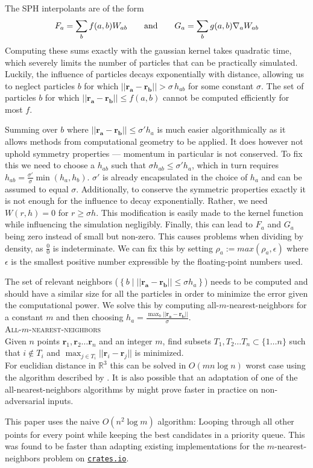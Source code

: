 \documentclass[../main.tex]{subfiles}
\begin{document}
The SPH interpolants are of the form
\[ F_a = \sum_b f(a, b) W_{ab} \qquad\textnormal{and}\qquad G_a = \sum_b g(a, b) \nabla_a W_{ab} \]
Computing these sums exactly with the gaussian kernel takes quadratic time, which severely limits
the number of particles that can be practically simulated. Luckily, the influence of particles
decays exponentially with distance, allowing us to neglect particles $b$ for which
$||\bm{r_a} - \bm{r_b}|| > \sigma \,  h_{ab}$ for some constant $\sigma$. The set of particles $b$
for which $||\bm{r_a} - \bm{r_b}|| \le f(a, b)$ cannot be computed efficiently for most $f$.

Summing over $b$ where $||\bm{r_a} - \bm{r_b}|| \le \sigma' h_a$ is much easier algorithmically as
it allows methods from computational geometry to be applied. It does however not uphold symmetry
properties --- momentum in particular is not conserved. To fix this we need to choose a $h_{ab}$
such that $\sigma h_{ab} \le \sigma' h_a$, which in turn requires
$h_{ab} = \frac{\sigma'}{\sigma} \min(h_a, h_b)$. $\sigma'$ is already encapsulated in the choice
of $h_a$ and can be assumed to equal $\sigma$. Additionally, to conserve the symmetric properties
exactly it is not enough for the influence to decay exponentially. Rather, we need $W(r, h) = 0$
for $r \ge \sigma h$. This modification is easily made to the kernel function while influencing the
simulation negligibly. Finally, this can lead to $F_a$ and $G_a$ being zero instead of small but
non-zero. This causes problems when dividing by density, as $\frac{0}{0}$ is indeterminate. We can
fix this by setting $\rho_a := max(\rho_a, \epsilon)$ where $\epsilon$ is the smallest positive
number expressible by the floating-point numbers used.

The set of relevant neighbors ($\left\{ b \mid ||\bm{r_a} - \bm{r_b}|| \le \sigma h_a \right\}$)
needs to be computed and should have a similar size for all the particles in order to minimize the
error given the computational power. We solve this by computing all-$m$-nearest-neighbors for a
constant $m$ and then choosing $h_a = \frac{\max_b ||\bm{r_a} - \bm{r_b}||}{\sigma}$.
\\

\textsc{All-$m$-nearest-neighbors}
\\
Given $n$ points $\bm{r}_1, \bm{r}_2 \dotsc \bm{r}_n$ and an integer $m$, find subsets
$T_1, T_2 \dotsc T_n \subset \{ 1 \dots n \}$ such that $i \notin T_i$ and
$\displaystyle \max_{j \in T_i} ||\bm{r}_i - \bm{r}_j||$ is minimized.
\\

For euclidian distance in $\mathbb{R}^3$ this can be solved in $O(m n \log n)$ worst case using the
algorithm described by \textcite{neighbors}. It is also possible that an adaptation of one of the
all-nearest-neighbors algorithms by \textcite{random_neighbors} might prove faster in practice on
non-adversarial inputs.

This paper uses the naive $O(n^2 \log m)$ algorithm: Looping through all other points for every
point while keeping the best candidates in a priority queue. This was found to be faster than
adapting existing implementations for the $m$-nearest-neighbors problem on
\href{https://crates.io}{\texttt{crates.io}}.
\end{document}
